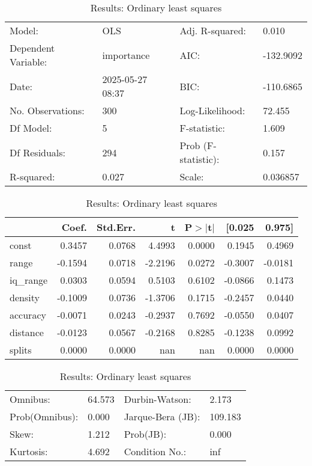 \begin{table}
\caption{Results: Ordinary least squares}
\label{}
\begin{center}
\begin{tabular}{llll}
\hline
Model:              & OLS              & Adj. R-squared:     & 0.010      \\
Dependent Variable: & importance       & AIC:                & -132.9092  \\
Date:               & 2025-05-27 08:37 & BIC:                & -110.6865  \\
No. Observations:   & 300              & Log-Likelihood:     & 72.455     \\
Df Model:           & 5                & F-statistic:        & 1.609      \\
Df Residuals:       & 294              & Prob (F-statistic): & 0.157      \\
R-squared:          & 0.027            & Scale:              & 0.036857   \\
\hline
\end{tabular}
\end{center}

\begin{center}
\begin{tabular}{lrrrrrr}
\hline
          &   Coef. & Std.Err. &       t & P$> |$t$|$ &  [0.025 &  0.975]  \\
\hline
const     &  0.3457 &   0.0768 &  4.4993 &      0.0000 &  0.1945 &  0.4969  \\
range     & -0.1594 &   0.0718 & -2.2196 &      0.0272 & -0.3007 & -0.0181  \\
iq\_range &  0.0303 &   0.0594 &  0.5103 &      0.6102 & -0.0866 &  0.1473  \\
density   & -0.1009 &   0.0736 & -1.3706 &      0.1715 & -0.2457 &  0.0440  \\
accuracy  & -0.0071 &   0.0243 & -0.2937 &      0.7692 & -0.0550 &  0.0407  \\
distance  & -0.0123 &   0.0567 & -0.2168 &      0.8285 & -0.1238 &  0.0992  \\
splits    &  0.0000 &   0.0000 &     nan &         nan &  0.0000 &  0.0000  \\
\hline
\end{tabular}
\end{center}

\begin{center}
\begin{tabular}{llll}
\hline
Omnibus:       & 64.573 & Durbin-Watson:    & 2.173    \\
Prob(Omnibus): & 0.000  & Jarque-Bera (JB): & 109.183  \\
Skew:          & 1.212  & Prob(JB):         & 0.000    \\
Kurtosis:      & 4.692  & Condition No.:    & inf      \\
\hline
\end{tabular}
\end{center}
\end{table}
